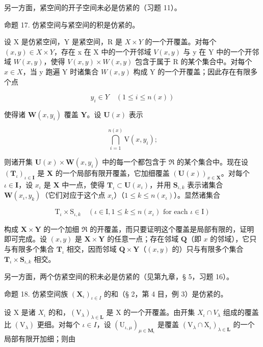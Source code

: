 另一方面，紧空间的开子空间未必是仿紧的（习题 11）。

命题 17. 仿紧空间与紧空间的积是仿紧的。

设 X 是仿紧空间，Y 是紧空间，R 是 \(X \times Y\) 的一个开覆盖。对每个 \((x, y) \in X \times Y\)，存在 x 在 X 中的一个开邻域 \(V(x, y)\) 与 y 在 Y 中的一个开邻域 \(W(x, y)\)，使得 \(V(x, y) \times W(x, y)\) 包含于属于 R 的某个集合中。对每个 \(x \in X\)，当 y 跑遍 Y 时诸集合 \(W(x, y)\) 构成 Y 的一个开覆盖；因此存在有限多个点

\[
y _ {i} \in Y \quad (1 \leqslant i \leqslant n (x))
\]

使得诸 \(\mathbf{W}(x, y_i)\) 覆盖 \(\mathbf{Y}\)。设 \(\mathbf{U}(x)\) 表示

\[
\bigcap_ {i = 1} ^ {n (x)} \mathrm{V} (x, y _ {i});
\]

则诸开集 \(\mathbf{U}(x) \times \mathbf{W}(x, y_i)\) 中的每一个都包含于 \(\Re\) 的某个集合中。现在设 \((\mathbf{T}_{\iota})_{\iota \in \mathbf{I}}\) 是 \(\mathbf{X}\) 的一个局部有限开覆盖，它加细覆盖 \((\mathbf{U}(x))_{x \in \mathbf{X}}\)。对每个 \(\iota \in \mathbf{I}\)，设 \(x_{\iota}\) 是 \(\mathbf{X}\) 中一点，使得 \(\mathbf{T}_{\iota} \subset \mathbf{U}(x_{\iota})\)，并用 \(\mathbf{S}_{\iota,k}\) 表示诸集合 \(\mathbf{W}(x_{\iota}, y_k)\)（它们对应于这个点 \(x_{\iota}\)）（\(1 \leqslant k \leqslant n(x_{\iota})\)）。显然诸集合

\[
\mathrm{T} _ {\iota} \times \mathrm{S} _ {\iota, k} \quad (\iota \in \mathrm{I}, 1 \leqslant k \leqslant n (x _ {\iota}) \text {   for   each   } \iota \in \mathrm{I})
\]

构成 \(\mathbf{X} \times \mathbf{Y}\) 的一个加细 \(\Re\) 的开覆盖，而只要证明这个覆盖是局部有限的，证明即可完成。设 \((x, y)\) 是 \(\mathbf{X} \times \mathbf{Y}\) 的任意一点；存在邻域 \(\mathbf{Q}\)（即 \(x\) 的邻域），它只与有限多个集合 \(\mathbf{T}_{\iota}\) 相交，因而邻域 \(\mathbf{Q} \times \mathbf{Y}\)（\((x, y)\) 的）只与有限多个集合 \(\mathbf{T}_{\iota} \times \mathbf{S}_{\iota,k}\) 相交。

另一方面，两个仿紧空间的积未必是仿紧的（见第九章，§ 5，习题 16）。

命题 18. 仿紧空间族 \((\mathbf{X}_{\iota})_{\iota\in I}\) 的和（§ 2，第 4 目，例 3）是仿紧的。

设 X 是诸 \(X_{\iota}\) 的和，\((\mathrm{V}_{\lambda})_{\lambda\in\mathbf{L}}\) 是 X 的一个开覆盖。由开集 \(X_{\iota}\cap V_{\lambda}\) 组成的覆盖比 \((\mathrm{V}_{\lambda})\) 更细。对每个 \(\iota\in I\)，设 \((\mathrm{U}_{\iota,\mu})_{\mu\in\mathbf{M}_{\iota}}\) 是覆盖 \((\mathrm{V}_{\lambda}\cap\mathrm{X}_{\iota})_{\lambda\in\mathbf{L}}\) 的一个局部有限开加细；则由


